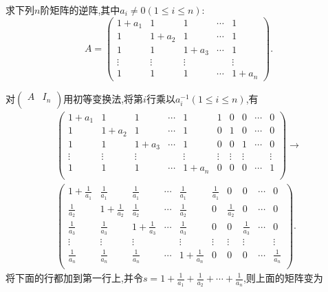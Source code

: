 \documentclass[../../main.tex]{subfiles}
\begin{document}
\begin{exercise}\label{exercise2.3}
求下列\(n\)阶矩阵的逆阵,其中\(a_i \neq 0(1\leq i\leq n)\):
\[
A = 
\begin{pmatrix}
1 + a_1 & 1 & 1 & \cdots & 1 \\
1 & 1 + a_2 & 1 & \cdots & 1 \\
1 & 1 & 1 + a_3 & \cdots & 1 \\
\vdots & \vdots & \vdots & & \vdots \\
1 & 1 & 1 & \cdots & 1 + a_n
\end{pmatrix}.
\]
\end{exercise}
\begin{solution}
对\(\left( \begin{matrix}
A&		I_n\\
\end{matrix} \right) \)用初等变换法,将第\(i\)行乘以\(a_i^{-1}(1\leq i\leq n)\),有
\begin{gather*}
\left( \begin{matrix}
1+a_1&		1&		1&		\cdots&		1&		1&		0&		0&		\cdots&		0\\
1&		1+a_2&		1&		\cdots&		1&		0&		1&		0&		\cdots&		0\\
1&		1&		1+a_3&		\cdots&		1&		0&		0&		1&		\cdots&		0\\
\vdots&		\vdots&		\vdots&		&		\vdots&		\vdots&		\vdots&		\vdots&		&		\vdots\\
1&		1&		1&		\cdots&		1+a_n&		0&		0&		0&		\cdots&		1\\
\end{matrix} \right) \rightarrow 
\\
\left( \begin{matrix}
1+\frac{1}{a_1}&		\frac{1}{a_1}&		\frac{1}{a_1}&		\cdots&		\frac{1}{a_1}&		\frac{1}{a_1}&		0&		0&		\cdots&		0\\
\frac{1}{a_2}&		1+\frac{1}{a_2}&		\frac{1}{a_2}&		\cdots&		\frac{1}{a_2}&		0&		\frac{1}{a_2}&		0&		\cdots&		0\\
\frac{1}{a_3}&		\frac{1}{a_3}&		1+\frac{1}{a_3}&		\cdots&		\frac{1}{a_3}&		0&		0&		\frac{1}{a_3}&		\cdots&		0\\
\vdots&		\vdots&		\vdots&		&		\vdots&		\vdots&		\vdots&		\vdots&		&		\vdots\\
\frac{1}{a_n}&		\frac{1}{a_n}&		\frac{1}{a_n}&		\cdots&		1+\frac{1}{a_n}&		0&		0&		0&		\cdots&		\frac{1}{a_n}\\
\end{matrix} \right) .
\end{gather*}
将下面的行都加到第一行上,并令\(s = 1 + \frac{1}{a_1} + \frac{1}{a_2} + \cdots + \frac{1}{a_n}\),则上面的矩阵变为

\end{solution}
\end{document}

